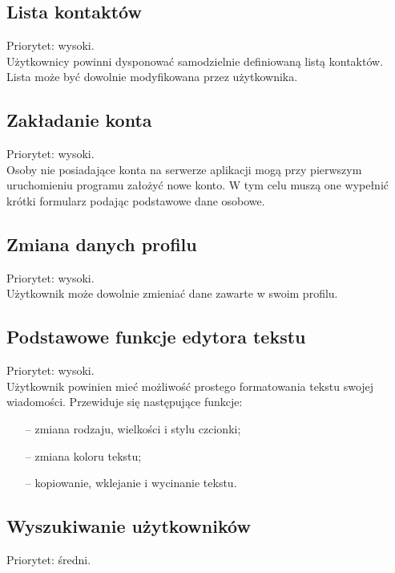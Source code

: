 \documentclass[a4paper,12pt]{article}
\begin{document}
\subsection[Lista kontaktów]{Lista kontaktów}

Priorytet: wysoki.\\

Użytkownicy powinni dysponować samodzielnie definiowaną listą kontaktów. Lista może być dowolnie modyfikowana przez użytkownika.

\subsection[Zakładanie konta]{Zakładanie konta}

Priorytet: wysoki.\\

Osoby nie posiadające konta na serwerze aplikacji mogą przy pierwszym uruchomieniu programu założyć nowe konto. W tym celu muszą one wypełnić krótki formularz podając podstawowe dane osobowe.

\subsection[Zmiana danych profilu]{Zmiana danych profilu}

Priorytet: wysoki.\\

Użytkownik może dowolnie zmieniać dane zawarte w swoim profilu.

\subsection[Podstawowe funkcje edytora tekstu]{Podstawowe funkcje edytora tekstu}

Priorytet: wysoki.\\

Użytkownik powinien mieć możliwość prostego formatowania tekstu swojej wiadomości.
Przewiduje się następujące funkcje:
\begin{itemize}
    \item[--] zmiana rodzaju, wielkości i stylu czcionki;
    \item[--] zmiana koloru tekstu;
    \item[--] kopiowanie, wklejanie i wycinanie tekstu.
\end{itemize}

\subsection[Wyszukiwanie użytkowników]{Wyszukiwanie użytkowników}
Priorytet: średni.\\
\end{document}
